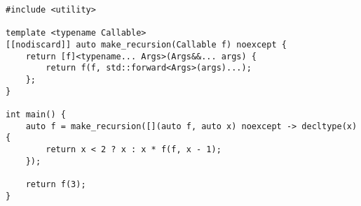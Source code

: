 \begin{lstlisting}[title=\href{https://godbolt.org/z/kf73qG}{\texttt{godbolt.org/z/kf73qG}}]
#include <utility>

template <typename Callable>
[[nodiscard]] auto make_recursion(Callable f) noexcept {
    return [f]<typename... Args>(Args&&... args) {
        return f(f, std::forward<Args>(args)...);
    };
}

int main() {
    auto f = make_recursion([](auto f, auto x) noexcept -> decltype(x) {
        return x < 2 ? x : x * f(f, x - 1);
    });

    return f(3);
}
\end{lstlisting}
